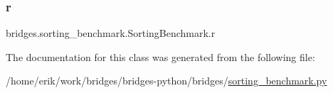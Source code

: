 \mbox{\label{classbridges_1_1sorting__benchmark_1_1_sorting_benchmark_ae7fb15c11ff3cd6f17a2966f70d26a92}} 
\subsubsection{\texorpdfstring{r}{r}}
{\footnotesize\ttfamily bridges.\+sorting\+\_\+benchmark.\+Sorting\+Benchmark.\+r}



The documentation for this class was generated from the following file\+:\begin{DoxyCompactItemize}
\item 
/home/erik/work/bridges/bridges-\/python/bridges/\hyperlink{sorting__benchmark_8py}{sorting\+\_\+benchmark.\+py}\end{DoxyCompactItemize}
